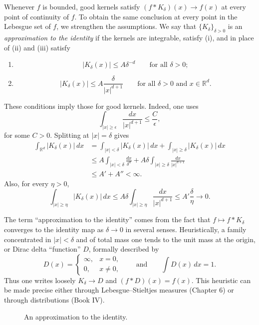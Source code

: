 \documentclass[11pt,openany]{book}
\begin{document}
Whenever $f$ is bounded, good kernels satisfy $(f*K_\delta)(x)\to f(x)$ at every point of continuity of $f$. To obtain the same conclusion at every point in the Lebesgue set of $f$, we strengthen the assumptions. We say that $\{K_\delta\}_{\delta>0}$ is an \emph{approximation to the identity} if the kernels are integrable, satisfy (i), and in place of (ii) and (iii) satisfy
\begin{enumerate}
\item[(ii$'$)]
\[
|K_\delta(x)|\le A\delta^{-d}
\qquad\text{for all }\delta>0;
\]
\item[(iii$'$)]
\[
|K_\delta(x)|\le A\frac{\delta}{|x|^{d+1}}
\qquad\text{for all }\delta>0\text{ and }x\in\mathbb R^d.
\]
\end{enumerate}
These conditions imply those for good kernels. Indeed, one uses
\begin{equation}
\int_{|x|\ge\epsilon}\frac{dx}{|x|^{d+1}}\le\frac C\epsilon,
\tag{5}
\end{equation}
for some $C>0$. Splitting at $|x|=\delta$ gives
\begin{align*}
\int_{\mathbb R^d}|K_\delta(x)|\,dx
&=\int_{|x|<\delta}|K_\delta(x)|\,dx
 +\int_{|x|\ge\delta}|K_\delta(x)|\,dx\\
&\le A\int_{|x|<\delta}\frac{dx}{\delta^d}
 +A\delta\int_{|x|\ge\delta}\frac{dx}{|x|^{d+1}}\\
&\le A'+A''<\infty.
\end{align*}
Also, for every $\eta>0$,
\[
\int_{|x|\ge\eta}|K_\delta(x)|\,dx
\le A\delta\int_{|x|\ge\eta}\frac{dx}{|x|^{d+1}}
\le A'\frac\delta\eta\to0.
\]

The term ``approximation to the identity'' comes from the fact that $f\mapsto f*K_\delta$ converges to the identity map as $\delta\to0$ in several senses. Heuristically, a family concentrated in $|x|<\delta$ and of total mass one tends to the unit mass at the origin, or Dirac delta ``function'' $D$, formally described by
\[
D(x)=
\begin{cases}
\infty,&x=0,\\
0,&x\ne0,
\end{cases}
\qquad\text{and}\qquad
\int D(x)\,dx=1.
\]
Thus one writes loosely $K_\delta\to D$ and $(f*D)(x)=f(x)$. This heuristic can be made precise either through Lebesgue--Stieltjes measures (Chapter 6) or through distributions (Book IV).

\begin{figure}[ht]
\centering
{}
\caption{An approximation to the identity.}
\end{figure}
\end{document}
